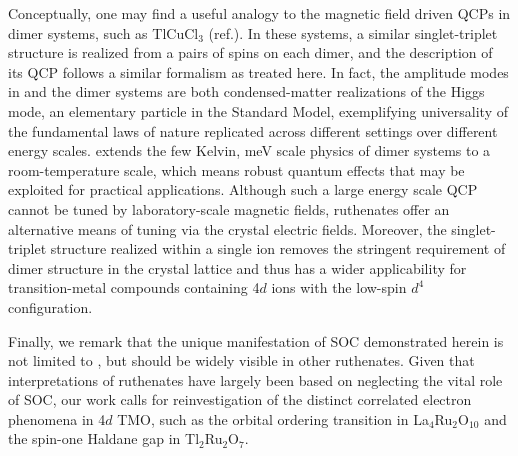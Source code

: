 Conceptually, one may find a useful analogy to the magnetic field driven QCPs in dimer systems, such as TlCuCl$_3$ (ref.\cite{R_egg_2003}). In these systems, a similar singlet-triplet structure is realized from a pairs of spins on each dimer, and the description of its QCP follows a similar formalism as treated here. In fact, the amplitude modes in \CRO and the dimer systems \cite{R_egg_2008}are both condensed-matter realizations of the Higgs mode\cite{Endres_2012,Pollet_2012}, an elementary particle in the Standard Model, exemplifying universality of the fundamental laws of nature replicated across different settings over different energy scales. \CRO extends the few Kelvin, meV scale physics of dimer systems to a room-temperature scale, which means robust quantum effects that may be exploited for practical applications. Although such a large energy scale QCP cannot be tuned by laboratory-scale magnetic fields, ruthenates offer an alternative means of tuning via the crystal electric fields. Moreover, the singlet-triplet structure realized within a single ion removes the stringent requirement of dimer structure in the crystal lattice and thus has a wider applicability for transition-metal compounds containing 4$d$ ions with the low-spin $d^4$ configuration.
  
Finally, we remark that the unique manifestation of SOC demonstrated herein is not limited to \CROns, but should be widely visible in other ruthenates. Given that interpretations of ruthenates have largely been based on neglecting the vital role of SOC, our work calls for reinvestigation of the distinct correlated electron phenomena in 4$d$ TMO, such as the orbital ordering transition in La$_4$Ru$_2$O$_{10}$ and the spin-one Haldane gap in Tl$_2$Ru$_2$O$_7$.
  
  
  
  
  
  
  
  
  
  
  